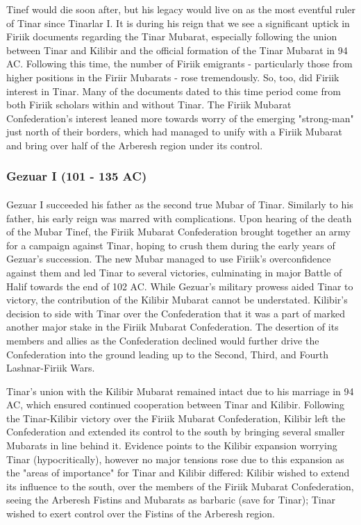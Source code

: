 					Tinef would die soon after, but his legacy would live on as the most eventful ruler of Tinar since Tinarlar I. It is during his reign that we see a significant uptick in Firiik documents regarding the Tinar Mubarat, especially following the union between Tinar and Kilibir and the official formation of the Tinar Mubarat in 94 AC. Following this time, the number of Firiik emigrants - particularly those from higher positions in the Firiir Mubarats - rose tremendously. So, too, did Firiik interest in Tinar. Many of the documents dated to this time period come from both Firiik scholars within and without Tinar. The Firiik Mubarat Confederation's interest leaned more towards worry of the emerging "strong-man" just north of their borders, which had managed to unify with a Firiik Mubarat and bring over half of the Arberesh region under its control. 

			\subsubsection{Gezuar I (101 - 135 AC)}
				\paragraph{}
					Gezuar I succeeded his father as the second true Mubar of Tinar. Similarly to his father, his early reign was marred with complications. Upon hearing of the death of the Mubar Tinef, the Firiik Mubarat Confederation brought together an army for a campaign against Tinar, hoping to crush them during the early years of Gezuar's succession. The new Mubar managed to use Firiik's overconfidence against them and led Tinar to several victories, culminating in major Battle of Halif towards the end of 102 AC. While Gezuar's military prowess aided Tinar to victory, the contribution of the Kilibir Mubarat cannot be understated. Kilibir's decision to side with Tinar over the Confederation that it was a part of marked another major stake in the Firiik Mubarat Confederation. The desertion of its members and allies as the Confederation declined would further drive the Confederation into the ground leading up to the Second, Third, and Fourth Lashnar-Firiik Wars.
					
					Tinar's union with the Kilibir Mubarat remained intact due to his marriage in 94 AC, which ensured continued cooperation between Tinar and Kilibir. Following the Tinar-Kilibir victory over the Firiik Mubarat Confederation, Kilibir left the Confederation and extended its control to the south by bringing several smaller Mubarats in line behind it. Evidence points to the Kilibir expansion worrying Tinar (hypocritically), however no major tensions rose due to this expansion as the "areas of importance" for Tinar and Kilibir differed: Kilibir wished to extend its influence to the south, over the members of the Firiik Mubarat Confederation, seeing the Arberesh Fistins and Mubarats as barbaric (save for Tinar); Tinar wished to exert control over the Fistins of the Arberesh region. 
					
